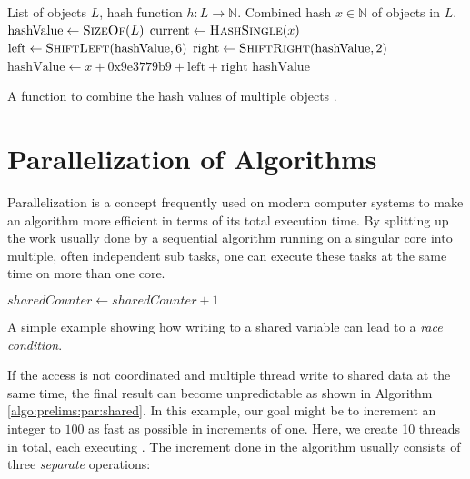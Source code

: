 		\begin{algorithm}[ht!]
			\centering
			\begin{algorithmic}
				\Require List of objects $L$, hash function $h: L \rightarrow \mathbb{N}$.
				\Ensure Combined hash $x \in \mathbb{N}$ of objects in $L$.
				\Statex
				\State $\mathrm{hashValue} \gets \Call{SizeOf}{L}$
					\State $\mathrm{current} \gets \Call{HashSingle}{x}$
					\State $\mathrm{left} \gets \Call{ShiftLeft}{\mathrm{hashValue}, 6}$
					\State $\mathrm{right} \gets \Call{ShiftRight}{\mathrm{hashValue}, 2}$
					\State $\mathrm{hashValue} \gets x + \mathrm{0x9e3779b9} + \mathrm{left} + \mathrm{right}$
				\EndFor
				\State \Return $\mathrm{hashValue}$
				\EndFunction
			\end{algorithmic}
			\caption{A function to combine the hash values of multiple objects \cite{boostBoostLibraries}.}
			\label{algo:prelims:hash:combined}
		\end{algorithm}

		\clearpage

	\section{Parallelization of Algorithms}
	\label{chap:prelims:par}

		Parallelization is a concept frequently used on modern computer systems to make an algorithm more efficient in terms of its total execution time.
		By splitting up the work usually done by a sequential algorithm running on a singular core into multiple, often independent sub tasks, one can execute these tasks at the same time on more than one core.

		\begin{algorithm}[ht!]
			\centering
			\begin{algorithmic}
				\Function{CountUp}{sharedCounter, n}
					\State $sharedCounter \gets sharedCounter + 1$
				\EndFunction
			\end{algorithmic}
			\caption{A simple example showing how writing to a shared variable can lead to a \textit{race condition}.}
			\label{algo:prelims:par:shared}
		\end{algorithm}

		If the access is not coordinated and multiple thread write to shared data at the same time, the final result can become unpredictable as shown in Algorithm \ref{algo:prelims:par:shared}.
		In this example, our goal might be to increment an integer to $100$ as fast as possible in increments of one. Here, we create 10 threads in total, each executing .
		The increment done in the algorithm usually consists of three \textit{separate} operations:

